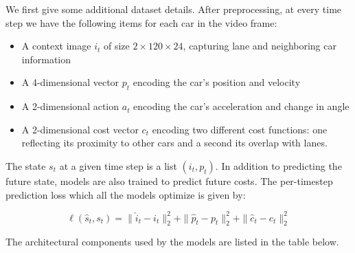 \documentclass{article}
\begin{document}
We first give some additional dataset details.
After preprocessing, at every time step we have the following items for each car in the video frame:


\begin{itemize}
\item A context image $i_t$ of size $2 \times 120 \times 24$, capturing lane and neighboring car information
\item A 4-dimensional vector $p_t$ encoding the car's position and velocity
\item A 2-dimensional action $a_t$ encoding the car's acceleration and change in angle
\item A 2-dimensional cost vector $c_t$ encoding two different cost functions: one reflecting its proximity to other cars and a second its overlap with lanes.
\end{itemize}

The state $s_t$ at a given time step is a list $(i_t, p_t)$. In addition to predicting the future state, models are also trained to predict future costs.
The per-timestep prediction loss which all the models optimize is given by:

\begin{equation}
\ell(\hat{s}_t, s_t) = \|\hat{i}_t - i_t \|_2^2 + \| \hat{p}_t - p_t \|_2^2 + \| \hat{c}_t - c_t \|_2^2
\end{equation}

The architectural components used by the models are listed in the table below.
\end{document}
